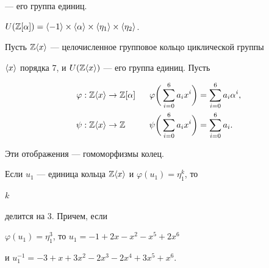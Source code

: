 --- его группа единиц. 


 


\begin{lem} 


$U(\myza)=\la-1\ra\times\la\alpha\ra\times 


\la\eta_1\ra\times\la\eta_2\ra$. 


\end{lem} 


 


Пусть $\Bbb Z\langle x\rangle$ --- целочисленное групповое кольцо циклической группы  


$\langle x\rangle$ порядка 7, и $U(\Bbb Z\langle x\rangle)$ --- его группа единиц. Пусть 


\begin{alignat*}{2}


\varphi&:\myzx\to\myza &\ \; \varphi\bigg(\sum^6_{i=0} 


a_i x^i\bigg)&=\sum^6_{i=0}a_i\alpha^i, \\ 


% 


\psi&:\myzx\to\Bbb Z &\ \; \psi\bigg(\sum^6_{i=0} 


a_i x^i\bigg)&=\sum^6_{i=0}a_i. 


\end{alignat*} 


Эти отображения --- гомоморфизмы колец. 


 


\begin{lem} 


Если $u_1$ --- единица кольца $\Bbb Z\langle x\rangle$ и $\varphi(u_1)=\eta^k_1$, то 


$k$ 


делится на $3$. Причем, если 


$\varphi(u_1)=\eta^3_1$, то $u_1=-1+2x-x^2-x^5+2x^6$ 


и $u^{-1}_1=-3+x+3x^2-2x^3-2x^4+3x^5+x^6$. 


\end{lem} 


 


